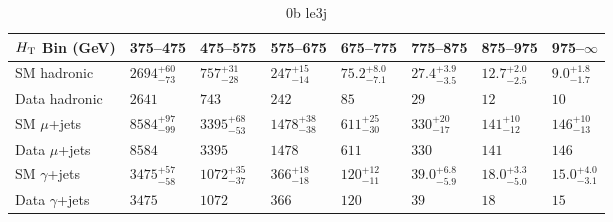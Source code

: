 \documentclass[8pt]{article}
\def\scalht{\mbox{$H_{\rm{T}}$}\xspace}
\newcommand\T{\rule{0pt}{2.6ex}}
\newcommand\B{\rule[-1.2ex]{0pt}{0pt}}
\begin{document}
\begin{table}[ht!]
\caption{0b le3j}
\label{tab:ensemble-0b le3j}
\centering
\begin{tabular}{ llllllll }

\hline
\scalht Bin (GeV)       & 375--475                       & 475--575                       & 575--675                       & 675--775                       & 775--875                       & 875--975                       & 975--$\infty$                  \\ [1.000000ex]
\hline
SM hadronic\T           & $2694^{+60}_{-73}$             & $757^{+31}_{-28}$              & $247^{+15}_{-14}$              & $75.2^{+8.0}_{-7.1}$           & $27.4^{+3.9}_{-3.5}$           & $12.7^{+2.0}_{-2.5}$           & $9.0^{+1.8}_{-1.7}$            \\ 
Data hadronic\B         & $2641$                         & $743$                          & $242$                          & $85$                           & $29$                           & $12$                           & $10$                           \\ 
\hline
SM $\mu$+jets\T         & $8584^{+97}_{-99}$             & $3395^{+68}_{-53}$             & $1478^{+38}_{-38}$             & $611^{+25}_{-30}$              & $330^{+20}_{-17}$              & $141^{+10}_{-12}$              & $146^{+10}_{-13}$              \\ 
Data $\mu$+jets\B       & $8584$                         & $3395$                         & $1478$                         & $611$                          & $330$                          & $141$                          & $146$                          \\ 
\hline
SM $\gamma$+jets\T      & $3475^{+57}_{-58}$             & $1072^{+35}_{-37}$             & $366^{+18}_{-18}$              & $120^{+12}_{-11}$              & $39.0^{+6.8}_{-5.9}$           & $18.0^{+3.3}_{-5.0}$           & $15.0^{+4.0}_{-3.1}$           \\ 
Data $\gamma$+jets\B    & $3475$                         & $1072$                         & $366$                          & $120$                          & $39$                           & $18$                           & $15$                           \\ 
\hline

\end{tabular}
\end{table}
\end{document}
